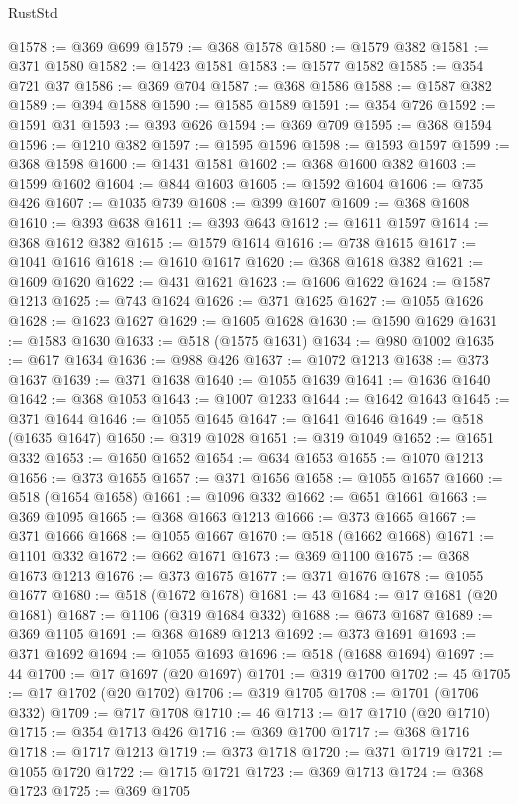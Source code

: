 \begin{lexlean}{RustStd}
\begin{coremodule}
@1578 := @369 @699
@1579 := @368 @1578
@1580 := @1579 @382
@1581 := @371 @1580
@1582 := @1423 @1581
@1583 := @1577 @1582
@1585 := @354 @721 @37
@1586 := @369 @704
@1587 := @368 @1586
@1588 := @1587 @382
@1589 := @394 @1588
@1590 := @1585 @1589
@1591 := @354 @726
@1592 := @1591 @31
@1593 := @393 @626
@1594 := @369 @709
@1595 := @368 @1594
@1596 := @1210 @382
@1597 := @1595 @1596
@1598 := @1593 @1597
@1599 := @368 @1598
@1600 := @1431 @1581
@1602 := @368 @1600 @382
@1603 := @1599 @1602
@1604 := @844 @1603
@1605 := @1592 @1604
@1606 := @735 @426
@1607 := @1035 @739
@1608 := @399 @1607
@1609 := @368 @1608
@1610 := @393 @638
@1611 := @393 @643
@1612 := @1611 @1597
@1614 := @368 @1612 @382
@1615 := @1579 @1614
@1616 := @738 @1615
@1617 := @1041 @1616
@1618 := @1610 @1617
@1620 := @368 @1618 @382
@1621 := @1609 @1620
@1622 := @431 @1621
@1623 := @1606 @1622
@1624 := @1587 @1213
@1625 := @743 @1624
@1626 := @371 @1625
@1627 := @1055 @1626
@1628 := @1623 @1627
@1629 := @1605 @1628
@1630 := @1590 @1629
@1631 := @1583 @1630
@1633 := @518 (@1575 @1631)
@1634 := @980 @1002
@1635 := @617 @1634
@1636 := @988 @426
@1637 := @1072 @1213
@1638 := @373 @1637
@1639 := @371 @1638
@1640 := @1055 @1639
@1641 := @1636 @1640
@1642 := @368 @1053
@1643 := @1007 @1233
@1644 := @1642 @1643
@1645 := @371 @1644
@1646 := @1055 @1645
@1647 := @1641 @1646
@1649 := @518 (@1635 @1647)
@1650 := @319 @1028
@1651 := @319 @1049
@1652 := @1651 @332
@1653 := @1650 @1652
@1654 := @634 @1653
@1655 := @1070 @1213
@1656 := @373 @1655
@1657 := @371 @1656
@1658 := @1055 @1657
@1660 := @518 (@1654 @1658)
@1661 := @1096 @332
@1662 := @651 @1661
@1663 := @369 @1095
@1665 := @368 @1663 @1213
@1666 := @373 @1665
@1667 := @371 @1666
@1668 := @1055 @1667
@1670 := @518 (@1662 @1668)
@1671 := @1101 @332
@1672 := @662 @1671
@1673 := @369 @1100
@1675 := @368 @1673 @1213
@1676 := @373 @1675
@1677 := @371 @1676
@1678 := @1055 @1677
@1680 := @518 (@1672 @1678)
@1681 := 43
@1684 := @17 @1681 (@20 @1681)
@1687 := @1106 (@319 @1684 @332)
@1688 := @673 @1687
@1689 := @369 @1105
@1691 := @368 @1689 @1213
@1692 := @373 @1691
@1693 := @371 @1692
@1694 := @1055 @1693
@1696 := @518 (@1688 @1694)
@1697 := 44
@1700 := @17 @1697 (@20 @1697)
@1701 := @319 @1700
@1702 := 45
@1705 := @17 @1702 (@20 @1702)
@1706 := @319 @1705
@1708 := @1701 (@1706 @332)
@1709 := @717 @1708
@1710 := 46
@1713 := @17 @1710 (@20 @1710)
@1715 := @354 @1713 @426
@1716 := @369 @1700
@1717 := @368 @1716
@1718 := @1717 @1213
@1719 := @373 @1718
@1720 := @371 @1719
@1721 := @1055 @1720
@1722 := @1715 @1721
@1723 := @369 @1713
@1724 := @368 @1723
@1725 := @369 @1705

\end{coremodule}
\end{lexlean}
